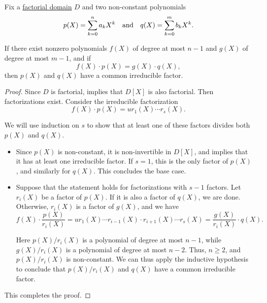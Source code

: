 \begin{lemma}\label{thm:linear_combination_implies_common_factor}
  Fix a \hyperref[def:factorial_domain]{factorial domain} \( D \) and two non-constant polynomials
  \begin{align*}
    p(X) = \sum_{k=0}^n a_k X^k
    &&\T{and}&&
    q(X) = \sum_{k=0}^m b_k X^k.
  \end{align*}

  If there exist nonzero polynomials \( f(X) \) of degree at most \( n - 1 \) and \( g(X) \) of degree at most \( m - 1 \), and if
  \begin{equation*}
    f(X) \cdot p(X) = g(X) \cdot q(X),
  \end{equation*}
  then \( p(X) \) and \( q(X) \) have a common irreducible factor.
\end{lemma}
\begin{proof}
  Since \( D \) is factorial,  implies that \( D[X] \) is also factorial. Then factorizations exist. Consider the irreducible factorization
  \begin{equation*}
    f(X) \cdot p(X) = u r_1(X) \cdots r_s(X).
  \end{equation*}

  We will use induction on \( s \) to show that at least one of these factors divides both \( p(X) \) and \( q(X) \).
  \begin{itemize}
    \item Since \( p(X) \) is non-constant, it is non-invertible in \( D[X] \), and  implies that it has at least one irreducible factor. If \( s = 1 \), this is the only factor of \( p(X) \), and similarly for \( q(X) \). This concludes the base case.

    \item Suppose that the statement holds for factorizations with \( s - 1 \) factors. Let \( r_i(X) \) be a factor of \( p(X) \). If it is also a factor of \( q(X) \), we are done. Otherwise, \( r_i(X) \) is a factor of \( g(X) \), and we have
    \begin{equation*}
      f(X) \cdot \frac {p(X)} {r_i(X)} = u r_1(X) \cdots r_{i-1}(X) \cdot r_{i+1}(X) \cdots r_s(X) = \frac {g(X)} {r_i(X)} \cdot q(X).
    \end{equation*}

    Here \( p(X) / r_i(X) \) is a polynomial of degree at most \( n - 1 \), while \( g(X) / r_i(X) \) is a polynomial of degree at most \( n - 2 \). Thus, \( n \geq 2 \), and \( p(X) / r_i(X) \) is non-constant. We can thus apply the inductive hypothesis to conclude that \( p(X) / r_i(X) \) and \( q(X) \) have a common irreducible factor.
  \end{itemize}

  This completes the proof.
\end{proof}

